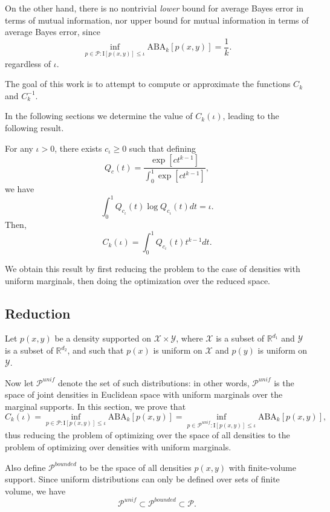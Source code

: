 \documentclass[12pt]{article}
\begin{document}
On the other hand, there is no nontrivial \emph{lower} bound for average Bayes error in terms of mutual information,
nor upper bound for mutual information in terms of average Bayes error, since
\[
\inf_{p \in \mathcal{P}: \text{I}[p(x,y)] \leq \iota} \text{ABA}_k[p(x,y)] = \frac{1}{k}.
\]
regardless of $\iota$.

The goal of this work is to attempt to compute or approximate the functions $C_k$ and $C_k^{-1}$.

In the following sections we determine the value of $C_k(\iota)$,
leading to the following result.

\begin{theorem}\label{theorem:Cunif}
For any $\iota > 0$, there exists $c_\iota \geq 0$ such that defining
\[
Q_c(t) = \frac{\exp[ct^{k-1}]}{\int_0^1 \exp[ct^{k-1}]},
\]
we have
\[
\int_0^1 Q_{c_\iota}(t) \log Q_{c_\iota}(t) dt = \iota.
\]
Then,
\[
C_k(\iota) = \int_0^1 Q_{c_\iota}(t) t^{k-1} dt.
\]
\end{theorem}

We obtain this result by first reducing the problem to the case of
densities with uniform marginals, then doing the optimization over the
reduced space.

\subsection{Reduction}

Let $p(x, y)$ be a density supported on
$\mathcal{X} \times \mathcal{Y}$, where $\mathcal{X}$ is a subset of
$\mathbb{R}^{d_1}$ and $\mathcal{Y}$ is a subset of
$\mathbb{R}^{d_2}$, and such that $p(x)$ is uniform on $\mathcal{X}$
and $p(y)$ is uniform on $\mathcal{Y}$.

Now let $\mathcal{P}^{unif}$ denote the set of such distributions:
in other words, $\mathcal{P}^{unif}$ is the space of joint densities in Euclidean space
with uniform marginals over the marginal supports.
In this section, we prove that
\[
C_k(\iota) =\inf_{p \in \mathcal{P}: \text{I}[p(x,y)] \leq \iota} \text{ABA}_k[p(x,y)] = 
\inf_{p \in \mathcal{P}^{unif}: \text{I}[p(x,y)] \leq \iota} \text{ABA}_k[p(x,y)],
\]
thus reducing the problem of optimizing over the space of all
densities to the problem of optimizing over densities with uniform
marginals.

Also define $\mathcal{P}^{bounded}$ to be the space of all densities $p(x, y)$ with finite-volume support.
Since uniform distributions can only be defined over sets of finite volume, we have
\[
\mathcal{P}^{unif} \subset \mathcal{P}^{bounded} \subset \mathcal{P}.
\]
\end{document}
